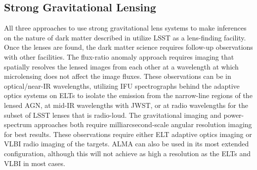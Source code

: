 \subsection{Strong Gravitational Lensing}
\label{sec:SLcomplement}

All three approaches to use strong gravitational lens systems to make inferences on the nature of dark matter  described in  utilize LSST as a lens-finding facility.
Once the lenses are found, the dark matter science requires follow-up observations with other facilities.
The flux-ratio anomaly approach requires imaging that spatially resolves the lensed images from each other at a wavelength at which microlensing does not affect the image fluxes.
These observations can be in optical/near-IR wavelengths, utilizing IFU spectrographs behind the adaptive optics systems on ELTs to isolate the emission from the narrow-line regions of the lensed AGN, at mid-IR wavelengths with JWST, or at radio wavelengths for the subset of LSST lenses that is radio-loud.
The gravitational imaging and power-spectrum approaches both require milliarcsecond-scale angular resolution imaging for best results.
These observations require either ELT adaptive optics imaging or VLBI radio imaging of the targets.
ALMA can also be used in its most extended configuration, although this will not achieve as high a resolution as the ELTs and VLBI in most cases.




